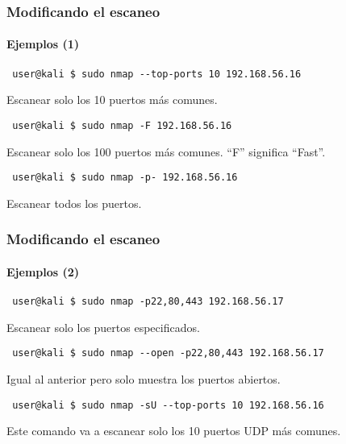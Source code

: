 \documentclass[aspectratio=169]{beamer}
\begin{document}
\begin{frame}[fragile]
    \frametitle{Modificando el escaneo}

    \framesubtitle{Ejemplos (1)}

    \begin{lstlisting}
 user@kali $ sudo nmap --top-ports 10 192.168.56.16
    \end{lstlisting}

    Escanear solo los 10 puertos m\'as comunes.

    \pause

    \begin{lstlisting}
 user@kali $ sudo nmap -F 192.168.56.16
    \end{lstlisting}

    Escanear solo los 100 puertos m\'as comunes. ``F'' significa ``Fast''.

    \pause

    \begin{lstlisting}
 user@kali $ sudo nmap -p- 192.168.56.16
    \end{lstlisting}

    Escanear todos los puertos.

\end{frame}

\begin{frame}[fragile]

    \frametitle{Modificando el escaneo}

    \framesubtitle{Ejemplos (2)}

    \begin{lstlisting}
 user@kali $ sudo nmap -p22,80,443 192.168.56.17
    \end{lstlisting}

    Escanear solo los puertos especificados.

    \pause

    \begin{lstlisting}
 user@kali $ sudo nmap --open -p22,80,443 192.168.56.17
    \end{lstlisting}

    Igual al anterior pero solo muestra los puertos abiertos.

    \pause

    \begin{lstlisting}
 user@kali $ sudo nmap -sU --top-ports 10 192.168.56.16
    \end{lstlisting}

    Este comando va a escanear solo los 10 puertos UDP m\'as comunes.

\end{frame}
\end{document}
